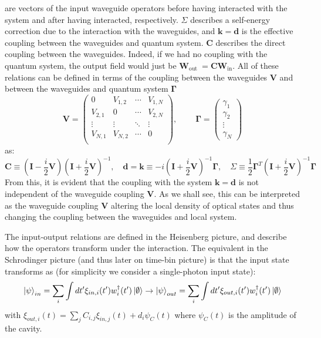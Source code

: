 are vectors of the input waveguide operators before having interacted with the system and after having interacted, respectively. $\Sigma$ describes a self-energy correction due to the interaction with the waveguides, and $\mathbf{k}=\mathbf{d}$ is the effective coupling between the waveguides and quantum system. $\mathbf{C}$ describes the direct coupling between the waveguides. Indeed, if we had no coupling with the quantum system, the output field would just be $\mathbf{W}_{\text {out }}=\mathbf{C} \mathbf{W}_{\mathrm{in}}$. All of these relations can be defined in terms of the coupling between the waveguides $\mathbf{V}$ and between the waveguides and quantum system $\mathbf{\Gamma}$
\begin{equation}
\textbf{V} = \begin{pmatrix}
    0 & V_{1,2} & \cdots & V_{1,N} \\
    V_{2,1} & 0 & \cdots & V_{2,N} \\
     \vdots & \vdots & \ddots & \vdots \\
     V_{N,1} & V_{N,2} & \cdots & 0 \\
\end{pmatrix},   \ \ \ \ \ \ \ \ \ \ \mathbf{\Gamma} =  \begin{pmatrix}
     \gamma_1 \\
    \gamma_2 \\
    \vdots \\
    \gamma_N
\end{pmatrix}
\end{equation}
as:
\begin{equation}
\mathbf{C} \equiv\left(\mathbf{I}-\frac{i}{2} \mathbf{V}\right)\left(\mathbf{I}+\frac{i}{2} \mathbf{V}\right)^{-1}, \quad \mathbf{d} = \mathbf{k} \equiv-i\left(\mathbf{I}+\frac{i}{2} \mathbf{V}\right)^{-1} \mathbf{\Gamma}, \quad \Sigma \equiv \frac{1}{2} \mathbf{\Gamma}^T\left(\mathbf{I}+\frac{i}{2} \mathbf{V}\right)^{-1} \mathbf{\Gamma} \label{eq:coupling_definitions}
\end{equation}
From this, it is evident that the coupling with the system $\mathbf{k}=\mathbf{d}$ is not independent of the waveguide coupling $\mathbf{V}$. As we shall see, this can be interpreted as the waveguide coupling $\mathbf{V}$ altering the local density of optical states and thus changing the coupling between the waveguides and local system. 

 The input-output relations are defined in the Heisenberg picture, and describe how the operators transform under the interaction. The equivalent in the Schrodinger picture (and thus later on time-bin picture) is that the input state transforms as (for simplicity we consider a single-photon input state):
\begin{equation}
    \ket{\psi}_{in} = \sum_i \int dt' \xi_{in,i}(t') w_i^\dagger(t') \ket{\emptyset} \rightarrow \ket{\psi}_{out} = \sum_i \int dt' \xi_{out,i}(t') w_i^\dagger(t') \ket{\emptyset}
\end{equation}
with $\xi_{out,i}(t) = \sum_j C_{i,j} \xi_{in,j}(t) + d_i \psi_C(t)$ where $\psi_C(t)$ is the amplitude of the cavity.

